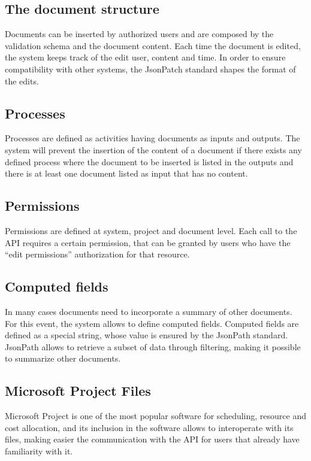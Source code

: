 \documentclass[12pt]{report}
\begin{document}
\subsection{The document structure}
Documents can be inserted by authorized users and are composed by the validation schema and the document content. Each time the document is edited, the system keeps track of the edit user, content and time. In order to ensure compatibility with other systems, the JsonPatch standard shapes the format of the edits.

\subsection{Processes}
Processes are defined as activities having documents as inputs and outputs. The system will prevent the insertion of the content of a document if there exists any defined process where the document to be inserted is listed in the outputs and there is at least one document listed as input that has no content.

\subsection{Permissions}

Permissions are defined at system, project and document level. Each call to the API requires a certain permission, that can be granted by users who have the “edit permissions” authorization for that resource.

\subsection{Computed fields}

In many cases documents need to incorporate a summary of other documents. For this event, the system allows to define computed fields. Computed fields are defined as a special string, whose value is ensured by the JsonPath standard. JsonPath allows to retrieve a subset of data through filtering, making it possible to summarize other documents.

\subsection{Microsoft Project Files}
Microsoft Project is one of the most popular software for scheduling, resource and cost allocation, and its inclusion in the software allows to interoperate with its files, making easier the communication with the API for users that already have familiarity with it.
\end{document}
